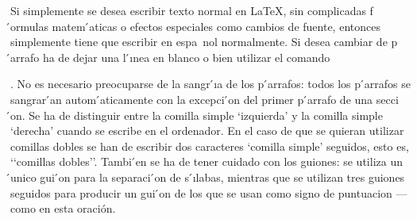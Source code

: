 \documentclass[a4paper,10pt]{letter}
\begin{document}
 Si simplemente se desea escribir texto normal en LaTeX,
 sin complicadas f ́ormulas matem ́aticas o efectos especiales
 como cambios de fuente, entonces simplemente tiene que escribir
 en espa~nol normalmente.
 Si desea cambiar de p ́arrafo ha de dejar una l ́ınea en blanco o bien
 utilizar el comando \par.
 No es necesario preocuparse de la sangr ́ıa de los p ́arrafos:
 todos los p ́arrafos se sangrar ́an autom ́aticamente con la excepci ́on
 del primer p ́arrafo de una secci ́on.
 Se ha de distinguir entre la comilla simple ‘izquierda’
 y la comilla simple ‘derecha’ cuando se escribe en el ordenador.
 En el caso de que se quieran utilizar comillas dobles se han de
 escribir dos caracteres ‘comilla simple’ seguidos, esto es,
 ‘‘comillas dobles’’.
 Tambi ́en se ha de tener cuidado con los guiones: se utiliza un ́unico
 gui ́on para la separaci ́on de s ́ılabas, mientras que se utilizan
 tres guiones seguidos para producir un gui ́on de los que se usan
como signo de puntuacion --- como en esta oración.
\end{document}
